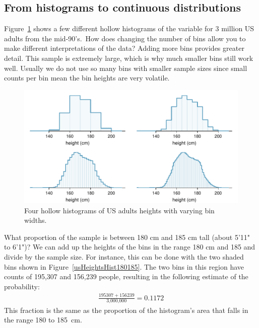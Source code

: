 \subsection{From histograms to continuous distributions}

\begin{examplewrap}
\begin{nexample}{Figure~\ref{fdicHistograms} shows a few different hollow histograms of the variable  for 3 million US adults from the mid-90's.\footnotemark\, How does changing the number of bins allow you to make different interpretations of the data?}\label{usHeights}
Adding more bins provides greater detail. This sample is extremely large, which is why much smaller bins still work well. Usually we do not use so many bins with smaller sample sizes since small counts per bin mean the bin heights are very volatile.
\end{nexample}
\end{examplewrap}

\begin{figure}[ht]
\centering
\includegraphics[width=\textwidth]{ch_probability/figures/fdicHistograms/fdicHistograms}
\caption{Four hollow histograms of US adults heights with varying bin widths.}
\label{fdicHistograms}
\end{figure}

\begin{examplewrap}
\begin{nexample}{What proportion of the sample is between 180 cm and 185 cm tall (about 5'11" to 6'1")?}\label{contDistProb}
We can add up the heights of the bins in the range 180 cm and 185 and divide by the sample size. For instance, this can be done with the two shaded bins shown in Figure~\ref{usHeightsHist180185}. The two bins in this region have counts of 195,307 and 156,239 people, resulting in the following estimate of the probability:
\begin{eqnarray*}
\frac{195307+156239}{\text{3,000,000}} = 0.1172
\end{eqnarray*}
This fraction is the same as the proportion of the histogram's area that falls in the range 180 to 185~cm.
\end{nexample}
\end{examplewrap}


